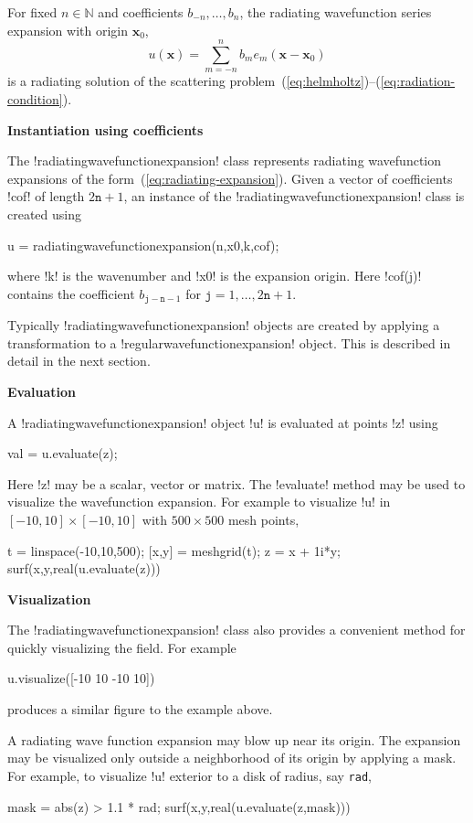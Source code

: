 \documentclass[12pt,letterpaper,final]{article}
\newcommand{\x}{\boldsymbol{x}}
\newcommand{\bbN}{\mathbb{N}}
\newcommand{\techheading}[1]{%
    \par\vspace{-0.3\parskip}\noindent\hspace{-1cm}\textbf{#1}%
    \par\vspace{-0.5\parskip}\noindent\nopagebreak\ignorespaces}
\begin{document}
For fixed $n \in \bbN$ and coefficients $b_{-n},\dots,b_n$, the 
radiating wavefunction series expansion
with origin $\x_0$,
\begin{equation}
\label{eq:radiating-expansion}
u(\x) = \sum_{m=-n}^n b_m e_m(\x - \x_0)
\end{equation}
is a radiating solution of the scattering problem~(\ref{eq:helmholtz})--(\ref{eq:radiation-condition}).

\techheading{Instantiation using coefficients}
The !radiatingwavefunctionexpansion! class represents radiating
wavefunction expansions of the form~(\ref{eq:radiating-expansion}).
Given a vector of coefficients !cof! of length $2 \texttt{n}+1$, an instance of the
!radiatingwavefunctionexpansion! class is created using
\begin{matlab}
u = radiatingwavefunctionexpansion(n,x0,k,cof);
\end{matlab}
where !k! is the wavenumber and !x0! is the expansion origin.
Here !cof(j)! contains the coefficient $b_{\texttt{j} - \texttt{n} -1}$
for $\texttt{j} = 1,\dots,2\texttt{n} + 1$.

Typically !radiatingwavefunctionexpansion! objects are created by
applying a transformation to a !regularwavefunctionexpansion! object.
This is described in detail in the next section.

\techheading{Evaluation}
A !radiatingwavefunctionexpansion! object !u! is evaluated at points !z! using
\begin{matlab}
val = u.evaluate(z);
\end{matlab}
Here !z! may be a scalar, vector or matrix.
The !evaluate! method may be used to visualize the wavefunction expansion.
For example to visualize !u! 
in $[-10, 10] \times [-10, 10]$ with $500 \times 500$ mesh points, 
\begin{matlab}
t = linspace(-10,10,500);
[x,y] = meshgrid(t);
z = x + 1i*y;
surf(x,y,real(u.evaluate(z)))
\end{matlab}

\techheading{Visualization}
The !radiatingwavefunctionexpansion!  class also provides a
convenient method for quickly visualizing the field. 
For example
\begin{matlab}
u.visualize([-10 10 -10 10])
\end{matlab}
produces a similar figure to the example above.

A radiating wave function expansion may blow up near its origin.
The expansion may be visualized only outside a neighborhood of its origin by 
applying a mask.
For example, to visualize !u! exterior to a disk
of radius, say {\tt rad},
\begin{matlab}
mask = abs(z) > 1.1 * rad;
surf(x,y,real(u.evaluate(z,mask)))
\end{matlab}
\end{document}
